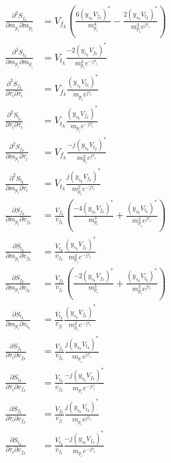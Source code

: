 \begin{equation}
    \begin{split}
        \frac{\partial^2 S_{f_k}}{\partial m_{p_i} \partial m_{p_i} } &= V_{f_k}(\frac{6(y_{s_k}V_{f_k})^*}{m_{p_i}^4} - \frac{2(y_{s_k}V_{t_k})^*}{m_{p_i}^3 e^{j\tau_i}})  \\
        \frac{\partial^2 S_{t_k}}{\partial m_{p_i} \partial m_{p_i} } &= V_{t_k} \frac{-2(y_{s_k}V_{f_k})^*}{m_{p_i}^3 e^{-j\tau_i}} \\
        \frac{\partial^2 S_{f_k}}{\partial \tau_i \partial \tau_i} &= V_{f_k} \frac{(y_{s_k}V_{t_k})^*}{m_{p_i} e^{j\tau_i}}\\
        \frac{\partial^2 S_{t_k}}{\partial \tau_i \partial \tau_i} &= V_{t_k} \frac{(y_{s_k}V_{f_k})^*}{m_{p_i} e^{-j\tau_i}}\\
        \frac{\partial^2 S_{f_k}}{\partial m_{p_i} \partial \tau_i} &= V_{f_k} \frac{-j(y_{s_k}V_{t_k})^*}{m_{p_i}^2 e^{j\tau_i}}\\
        \frac{\partial^2 S_{t_k}}{\partial m_{p_i} \partial \tau_i} &= V_{t_k} \frac{j(y_{s_k}V_{f_k})^*}{m_{p_i}^2 e^{-j\tau_i}}\\
        \frac{\partial S_{f_k}}{\partial m_{p_i} \partial v_{f_k}} &= \frac{V_{f_k}}{v_{f_k}} (\frac{-4(y_{s_k}V_{f_k})^*}{m_{p_i}^3} + \frac{(y_{s_k}V_{t_k})^*}{m_{p_i}^2 e^{j\tau_i}})  \\
        \frac{\partial S_{t_k}}{\partial m_{p_i} \partial v_{f_k}} &= \frac{V_{t_k}}{v_{f_k}}\frac{(y_{s_k}V_{f_k})^*}{m_{p_i}^2 e^{-j\tau_i}} \\
        \frac{\partial S_{f_k}}{\partial m_{p_i} \partial v_{t_k}} &= \frac{V_{f_k}}{v_{f_t}} (\frac{-2(y_{s_k}V_{f_k})^*}{m_{p_i}^3} + \frac{(y_{s_k}V_{t_k})^*}{m_{p_i}^2 e^{j\tau_i}})  \\
        \frac{\partial S_{t_k}}{\partial m_{p_i} \partial v_{t_k}} &= \frac{V_{t_k}}{v_{f_t}}\frac{(y_{s_k}V_{f_k})^*}{m_{p_i}^2 e^{-j\tau_i}} \\
        \frac{\partial S_{f_k}}{\partial \tau_i \partial v_{f_k}} &= \frac{V_{f_k}}{v_{f_k}} \frac{j(y_{s_k}V_{t_k})^*}{m_{p_i} e^{j\tau_i}}\\
        \frac{\partial S_{t_k}}{\partial \tau_i \partial v_{f_k}} &= \frac{V_{t_k}}{v_{f_k}} \frac{-j(y_{s_k}V_{f_k})^*}{m_{p_i} e^{-j\tau_i}}\\
        \frac{\partial S_{f_k}}{\partial \tau_i \partial v_{f_k}} &= \frac{V_{f_k}}{v_{f_t}} \frac{j(y_{s_k}V_{t_k})^*}{m_{p_i} e^{j\tau_i}}\\
        \frac{\partial S_{t_k}}{\partial \tau_i \partial v_{f_k}} &= \frac{V_{t_k}}{v_{f_t}} \frac{-j(y_{s_k}V_{f_k})^*}{m_{p_i} e^{-j\tau_i}}\\

\end{split}
\end{equation}
